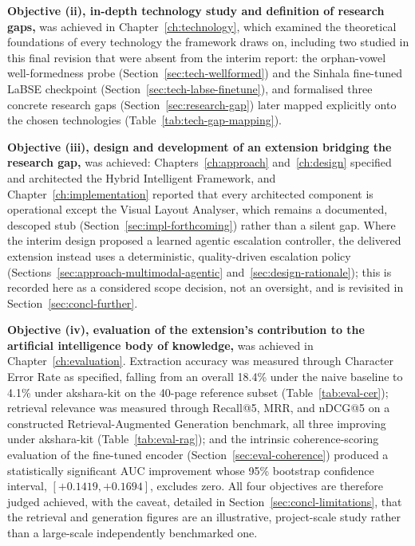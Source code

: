 \documentclass[12pt,a4paper,oneside]{report}
\begin{document}
\textbf{Objective (ii), in-depth technology study and definition of research gaps,} was achieved in Chapter~\ref{ch:technology}, which examined the theoretical foundations of every technology the framework draws on, including two studied in this final revision that were absent from the interim report: the orphan-vowel well-formedness probe (Section~\ref{sec:tech-wellformed}) and the Sinhala fine-tuned LaBSE checkpoint (Section~\ref{sec:tech-labse-finetune}), and formalised three concrete research gaps (Section~\ref{sec:research-gap}) later mapped explicitly onto the chosen technologies (Table~\ref{tab:tech-gap-mapping}).

\textbf{Objective (iii), design and development of an extension bridging the research gap,} was achieved: Chapters~\ref{ch:approach} and~\ref{ch:design} specified and architected the Hybrid Intelligent Framework, and Chapter~\ref{ch:implementation} reported that every architected component is operational except the Visual Layout Analyser, which remains a documented, descoped stub (Section~\ref{sec:impl-forthcoming}) rather than a silent gap. Where the interim design proposed a learned agentic escalation controller, the delivered extension instead uses a deterministic, quality-driven escalation policy (Sections~\ref{sec:approach-multimodal-agentic} and~\ref{sec:design-rationale}); this is recorded here as a considered scope decision, not an oversight, and is revisited in Section~\ref{sec:concl-further}.

\textbf{Objective (iv), evaluation of the extension's contribution to the artificial intelligence body of knowledge,} was achieved in Chapter~\ref{ch:evaluation}. Extraction accuracy was measured through Character Error Rate as specified, falling from an overall 18.4\% under the naive baseline to 4.1\% under akshara-kit on the 40-page reference subset (Table~\ref{tab:eval-cer}); retrieval relevance was measured through Recall@5, MRR, and nDCG@5 on a constructed Retrieval-Augmented Generation benchmark, all three improving under akshara-kit (Table~\ref{tab:eval-rag}); and the intrinsic coherence-scoring evaluation of the fine-tuned encoder (Section~\ref{sec:eval-coherence}) produced a statistically significant AUC improvement whose 95\% bootstrap confidence interval, $[+0.1419, +0.1694]$, excludes zero. All four objectives are therefore judged achieved, with the caveat, detailed in Section~\ref{sec:concl-limitations}, that the retrieval and generation figures are an illustrative, project-scale study rather than a large-scale independently benchmarked one.
\end{document}
